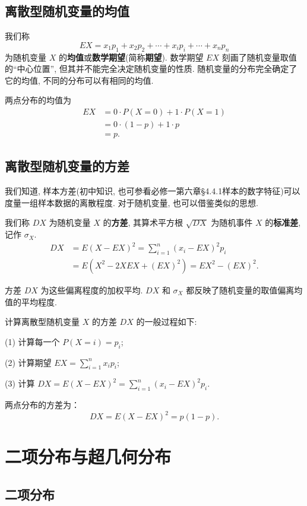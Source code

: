\documentclass[titlepage]{ctexart}
\begin{document}
\subsection{离散型随机变量的均值}

我们称
\[
EX = x_{1}p_{1} + x_{2}p_{2} + \cdots + x_{i}p_{i} + \cdots + x_{n}p_{n}
\]
为随机变量 $X$ 的\textbf{均值}或\textbf{数学期望}(简称\textbf{期望}). 数学期望 $EX$ 刻画了随机变量取值的``中心位置'', 但其并不能完全决定随机变量的性质.
随机变量的分布完全确定了它的均值, 不同的分布可以有相同的均值.

两点分布的均值为
\begin{align*}
    EX &= 0 \cdot P(X=0) + 1 \cdot P(X=1) \\
       &= 0 \cdot (1-p) + 1 \cdot p \\
       &= p.
\end{align*}

\subsection{离散型随机变量的方差}

我们知道, 样本方差(初中知识, 也可参看必修一第六章\S{4.4.1}样本的数字特征)可以度量一组样本数据的离散程度. 对于随机变量, 也可以借鉴类似的思想.

我们称 $DX$ 为随机变量 $X$ 的\textbf{方差}, 其算术平方根 $\sqrt{DX}$ 为随机事件 $X$ 的\textbf{标准差}, 记作 $\sigma_{X}$.
\begin{align*}
    DX &= E(X - EX)^2 = \sum_{i=1}^{n}(x_{i} - EX)^2p_{i} \\
       &= E(X^2 - 2XEX + (EX)^2) = EX^2 - (EX)^2.
\end{align*}

方差 $DX$ 为这些偏离程度的加权平均. $DX$ 和 $\sigma_{X}$ 都反映了随机变量的取值偏离均值的平均程度. 

计算离散型随机变量 $X$ 的方差 $DX$ 的一般过程如下:

(1) 计算每一个 $P(X=i) = p_{i}$;

(2) 计算期望 $EX = \sum\limits_{i=1}^{n}x_{i}p_{i}$;

(3) 计算 $DX = E(X - EX)^2 = \sum\limits_{i=1}^{n}(x_{i}-EX)^2p_{i}$.

两点分布的方差为：
\[
DX = E(X-EX)^2 = p(1-p).
\]


\section{二项分布与超几何分布}

\subsection{二项分布}
\end{document}
